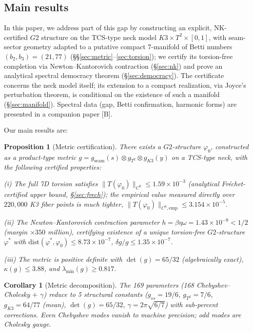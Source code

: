 \documentclass[11pt,a4paper]{article}
\newtheorem{proposition}[theorem]{Proposition}
\newtheorem{corollary}[theorem]{Corollary}
\theoremstyle{definition}
\theoremstyle{remark}
\newcommand{\Gtwo}{\mathrm{G}_2}
\def\Gtwo{G2}%
\begin{document}
\subsection{Main results}

In this paper, we address part of this gap by constructing an explicit, NK-certified $\Gtwo$ structure on the TCS-type neck model $K3 \times T^2 \times [0,1]$, with seam-sector geometry adapted to a putative compact 7-manifold of Betti numbers $(b_2, b_3) = (21, 77)$ (§§\ref{sec:metric}--\ref{sec:torsion}); we certify its torsion-free completion via Newton--Kantorovich contraction (§\ref{sec:nk}) and prove an analytical spectral democracy theorem (§\ref{sec:democracy}). The certificate concerns the neck model itself; its extension to a compact realization, via Joyce's perturbation theorem, is conditional on the existence of such a manifold (§\ref{sec:manifold}). Spectral data (gap, Betti confirmation, harmonic forms) are presented in a companion paper [B].

Our main results are:

\begin{proposition}[Metric certification]\label{prop:A}
There exists a $\Gtwo$-structure $\varphi_0$, constructed as a product-type metric $g = g_{\mathrm{seam}}(s) \otimes g_{T^2} \otimes g_{K3}(y)$ on a TCS-type neck, with the following certified properties:

\emph{(i)} The full 7D torsion satisfies $\|T(\varphi_0)\|_{C^0} \leq 1.59 \times 10^{-3}$ (analytical Fr\'echet-certified upper bound, §\ref{sec:frech}); the empirical value measured directly over $220{,}000$ K3 fiber points is much tighter, $\|T(\varphi_0)\|_{C^0,\mathrm{emp}} \leq 3.154 \times 10^{-5}$.

\emph{(ii)} The Newton--Kantorovich contraction parameter $h = \beta\eta\omega = 1.43 \times 10^{-9} < 1/2$ (margin $\times 350$ million), certifying existence of a unique torsion-free $\Gtwo$-structure $\varphi^*$ with $\mathrm{dist}(\varphi^*, \varphi_0) \leq 8.73 \times 10^{-7}$, $\delta g/g \leq 1.35 \times 10^{-7}$.

\emph{(iii)} The metric is positive definite with $\det(g) = 65/32$ (algebraically exact), $\kappa(g) \leq 3.88$, and $\lambda_{\min}(g) \geq 0.817$.
\end{proposition}

\begin{corollary}[Metric decomposition]
The 169 parameters (168 Chebyshev--Cholesky $+$ $\gamma$) reduce to 5 structural constants ($g_{ss} = 19/6$, $g_{T^2} = 7/6$, $g_{K3} = 64/77$ (mean), $\det(g) = 65/32$, $\gamma = 2\pi\sqrt{6/7}$) with sub-percent corrections. Even Chebyshev modes vanish to machine precision; odd modes are Cholesky gauge.
\end{corollary}
\end{document}
